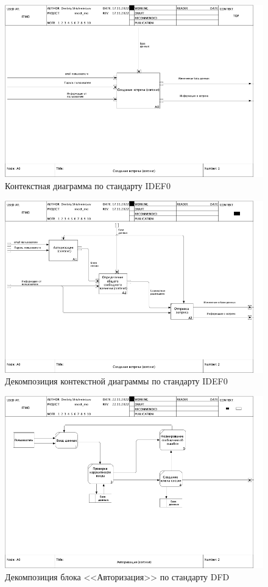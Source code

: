\documentclass[14pt]{extreport}
\begin{document}
\begin{landscape}
    \begin{figure}[h]   
        \centering
        \includegraphics[width=0.9\linewidth]{img/IDEF0-0.png}
        \caption{ Контекстная диаграмма по стандарту IDEF0}
        \label{fig:dfd1}
    \end{figure}

    \begin{figure}[h]   
        \centering
        \includegraphics[width=0.9\linewidth]{img/IDEF0-1.png}
        \caption{ Декомпозиция контекстной диаграммы по стандарту IDEF0}
        \label{fig:dfd2}
    \end{figure}

    \begin{figure}[h]   
        \centering
        \includegraphics[width=0.9\linewidth]{img/DFD1.png}
        \caption{ Декомпозиция блока <<Авторизация>> по стандарту DFD}
        \label{fig:dfd3}
    \end{figure}


\end{landscape}
\end{document}
